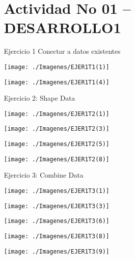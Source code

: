  \section{Actividad No 01 – DESARROLLO1} 
Ejercicio 1  Conectar a datos existentes \\
	\begin{center}
	\texttt{[image: ./Imagenes/EJER1T1(1)]}
	\end{center}	

	\begin{center}
	\texttt{[image: ./Imagenes/EJER1T1(4)]}
	\end{center}
	\newpage
Ejercicio 2: Shape Data\\
	\begin{center}
	\texttt{[image: ./Imagenes/EJER1T2(1)]}
	\end{center}	

	

	\begin{center}
	\texttt{[image: ./Imagenes/EJER1T2(3)]}
	\end{center}	
\newpage

	\begin{center}
	\texttt{[image: ./Imagenes/EJER1T2(5)]}
	\end{center}	


	

	\begin{center}
	\texttt{[image: ./Imagenes/EJER1T2(8)]}
	\end{center}	
\newpage
Ejercicio 3: Combine Data\\
	\begin{center}
	\texttt{[image: ./Imagenes/EJER1T3(1)]}
	\end{center}	

	\begin{center}
	\texttt{[image: ./Imagenes/EJER1T3(3)]}
	\end{center}	
\newpage
	

	\begin{center}
	\texttt{[image: ./Imagenes/EJER1T3(6)]}
	\end{center}	
	

	\begin{center}
	\texttt{[image: ./Imagenes/EJER1T3(8)]}
	\end{center}	
\newpage
	\begin{center}
	\texttt{[image: ./Imagenes/EJER1T3(9)]}
	\end{center}	


